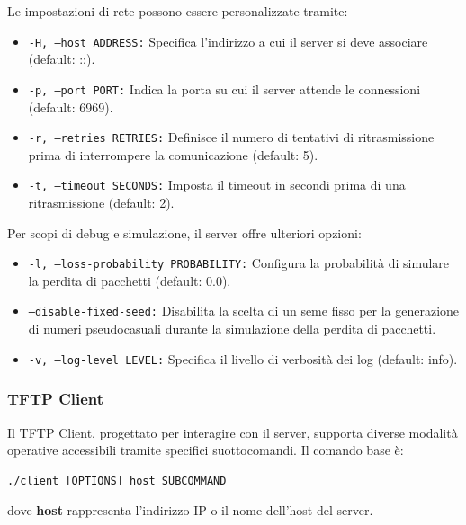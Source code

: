 \documentclass[12pt]{article}
\begin{document}
{Le impostazioni di rete possono essere personalizzate tramite:
\begin{itemize}
    \item \texttt{-H, --host ADDRESS:} Specifica l'indirizzo a cui il server si deve associare (default: ::).
    \item \texttt{-p, --port PORT:} Indica la porta su cui il server attende le connessioni (default: 6969).
    \item \texttt{-r, --retries RETRIES:} Definisce il numero di tentativi di ritrasmissione prima di interrompere la comunicazione (default: 5).
    \item \texttt{-t, --timeout SECONDS:} Imposta il timeout in secondi prima di una ritrasmissione (default: 2).
\end{itemize}

Per scopi di debug e simulazione, il server offre ulteriori opzioni:
\begin{itemize}
    \item \texttt{-l, --loss-probability PROBABILITY:} Configura la probabilità di simulare la perdita di pacchetti (default: 0.0).
    \item \texttt{--disable-fixed-seed:} Disabilita la scelta di un seme fisso per la generazione di numeri pseudocasuali durante la simulazione della perdita di pacchetti.
    \item \texttt{-v, --log-level LEVEL:} Specifica il livello di verbosità dei log (default: info).
\end{itemize}

\pagebreak
\subsubsection{TFTP Client}

Il TFTP Client, progettato per interagire con il server, supporta diverse modalità operative accessibili tramite specifici suottocomandi. Il comando base è:
\begin{verbatim}
./client [OPTIONS] host SUBCOMMAND
\end{verbatim}
dove \textbf{host} rappresenta l'indirizzo IP o il nome dell'host del server.

}
\end{document}
